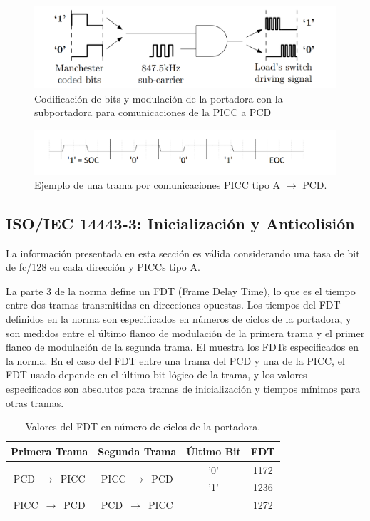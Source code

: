 \documentclass[a4paper, twoside, 11pt]{report}
\begin{document}
\begin{figure}[htb]
  \centering
  \includegraphics[scale=0.35]{./img/picc_to_pcd}
  \caption{Codificación de bits y modulación de la portadora con la subportadora para comunicaciones de la PICC a PCD~\cite{fabricio_eamta}}
  \label{fig:picc_to_pcd}
\end{figure}

\begin{figure}[htb]
  \centering
  \includegraphics[scale=0.5]{./img/tx_frame_example}
  \caption{Ejemplo de una trama por comunicaciones PICC tipo A $\rightarrow$ PCD.}
  \label{fig:tx_frame_example}
\end{figure}

\FloatBarrier
\subsection{ISO/IEC 14443-3: \large{Inicialización y Anticolisión}}

La información presentada en esta sección es válida considerando una tasa de bit de fc/128 en cada dirección y PICCs tipo A.

La parte 3 de la norma define un FDT (Frame Delay Time), lo que es el tiempo entre dos tramas transmitidas en direcciones opuestas. Los tiempos del FDT definidos en la norma son especificados en números de ciclos de la portadora, y son medidos entre el último flanco de modulación de la primera trama y el primer flanco de modulación de la segunda trama. El  muestra los FDTs especificados en la norma. En el caso del FDT entre una trama del PCD y una de la PICC, el FDT usado depende en el último bit lógico de la trama, y los valores especificados son absolutos para tramas de inicialización y tiempos mínimos para otras tramas.

\begin{table}[htb]
  \centering
  \begin{tabular}{|c|c|c|c|}
    \hline
    \textbf{Primera Trama} & \textbf{Segunda Trama} & \textbf{Último Bit} & \textbf{FDT} \\
    \hline
    \multirow{2}{*}{PCD~$\rightarrow$~PICC} & \multirow{2}{*}{PICC~$\rightarrow$~PCD} & '0' & 1172  \\
    \cline{3-4}
    & & '1' & 1236 \\
    \hline
    PICC~$\rightarrow$~PCD & PCD~$\rightarrow$~PICC & & 1272 \\
    \hline
  \end{tabular}
  \caption{Valores del FDT en número de ciclos de la portadora.}
  \label{tab:fdt}
\end{table}
\end{document}
